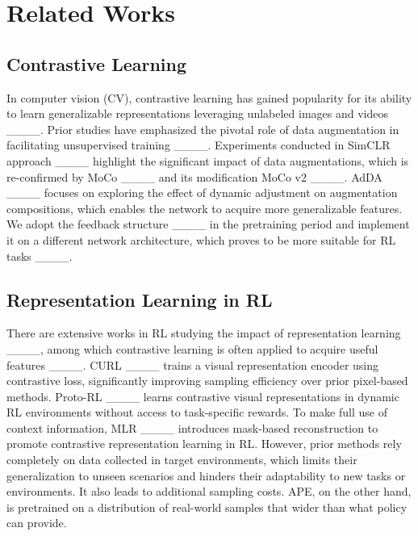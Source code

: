 \section{Related Works}
\subsection{Contrastive Learning}
In computer vision (CV), contrastive learning has gained popularity for its ability to learn generalizable representations leveraging unlabeled images and videos ____. Prior studies have emphasized the pivotal role of data augmentation in facilitating unsupervised training ____.
Experiments conducted in SimCLR approach ____ highlight the significant impact of data augmentations, which is re-confirmed by MoCo ____ and its modification MoCo v2 ____.
AdDA ____ focuses on exploring the effect of dynamic adjustment on augmentation compositions, which enables the network to acquire more generalizable features. 
We adopt the feedback structure ____  in the pretraining period and implement it on a different network architecture, which proves to be more suitable for RL tasks ____.




\subsection{Representation Learning in RL}
There are extensive works in RL studying the impact of representation learning ____, among which contrastive learning is often applied to acquire useful features ____. CURL ____ trains a visual representation encoder using contrastive loss, significantly improving sampling efficiency over prior pixel-based methods. Proto-RL ____ learns contrastive visual representations in dynamic RL environments without access to task-specific rewards. To make full use of context information, MLR ____ introduces mask-based reconstruction to promote contrastive representation learning in RL. 
However, prior methods rely completely on data collected in target environments, which limits their generalization to unseen scenarios and hinders their adaptability to new tasks or environments. It also leads to additional sampling costs. APE, on the other hand, is pretrained on a distribution of real-world samples that wider than what policy can provide. 

